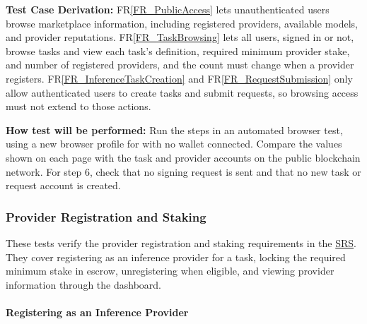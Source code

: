 \documentclass[12pt]{article}
\newcommand{\rref}[1]{FR\ref{#1}}
\newcommand{\fixture}[1]{\texttt{\seqsplit{#1}}}
\begin{document}
\begin{enumerate}
\textbf{Test Case Derivation:} \rref{FR_PublicAccess} lets unauthenticated users browse marketplace information,
including registered providers, available models, and provider reputations.
\rref{FR_TaskBrowsing} lets all users, signed in or not, browse tasks and view each task's definition,
required minimum provider stake, and number of registered providers, and the
count must change when a provider registers. \rref{FR_InferenceTaskCreation} and \rref{FR_RequestSubmission} only allow
authenticated users to create tasks and submit requests, so browsing access
must not extend to those actions.

\textbf{How test will be performed:} Run the steps in an automated browser test,
using a new browser profile for \fixture{V-01} with no wallet connected. Compare the
values shown on each page with the task and provider accounts on the public blockchain network.
For step 6, check that no signing request is sent and that no new task or
request account is created.

\end{enumerate}

\subsubsection{Provider Registration and Staking}

These tests verify the provider registration and staking requirements in the
\href{../SRS/SRS.pdf}{SRS}. They cover registering as an inference provider
for a task, locking the required minimum stake in escrow, unregistering when
eligible, and viewing provider information through the dashboard.

\paragraph{Registering as an Inference Provider}
\end{document}
